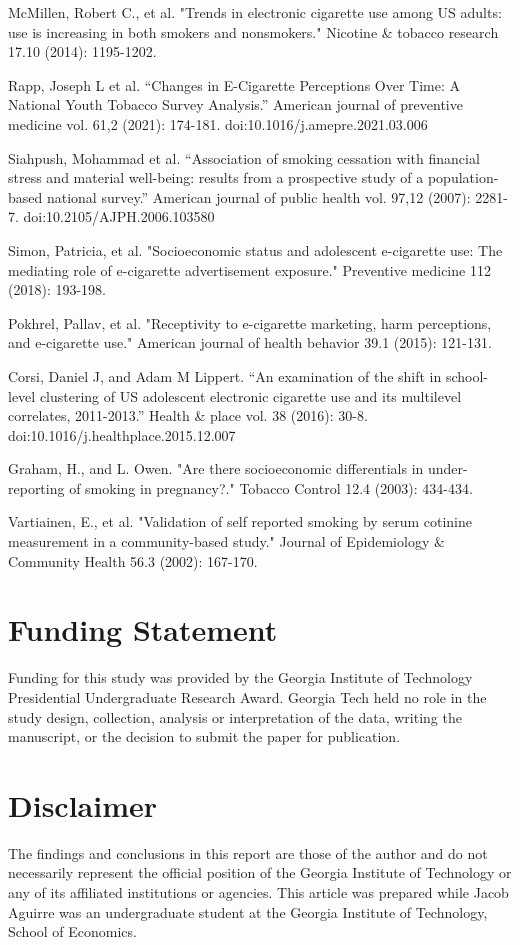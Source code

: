 \documentclass[12pt]{article}
\begin{document}
\begin{thebibliography}{}
McMillen, Robert C., et al. "Trends in electronic cigarette use among US adults: use is increasing in both smokers and nonsmokers." Nicotine \& tobacco research 17.10 (2014): 1195-1202.

Rapp, Joseph L et al. “Changes in E-Cigarette Perceptions Over Time: A National Youth Tobacco Survey Analysis.” American journal of preventive medicine vol. 61,2 (2021): 174-181. doi:10.1016/j.amepre.2021.03.006


Siahpush, Mohammad et al. “Association of smoking cessation with financial stress and material well-being: results from a prospective study of a population-based national survey.” American journal of public health vol. 97,12 (2007): 2281-7. doi:10.2105/AJPH.2006.103580


Simon, Patricia, et al. "Socioeconomic status and adolescent e-cigarette use: The mediating role of e-cigarette advertisement exposure." Preventive medicine 112 (2018): 193-198.

Pokhrel, Pallav, et al. "Receptivity to e-cigarette marketing, harm perceptions, and e-cigarette use." American journal of health behavior 39.1 (2015): 121-131.

Corsi, Daniel J, and Adam M Lippert. “An examination of the shift in school-level clustering of US adolescent electronic cigarette use and its multilevel correlates, 2011-2013.” Health \& place vol. 38 (2016): 30-8. doi:10.1016/j.healthplace.2015.12.007

Graham, H., and L. Owen. "Are there socioeconomic differentials in under-reporting of smoking in pregnancy?." Tobacco Control 12.4 (2003): 434-434.

Vartiainen, E., et al. "Validation of self reported smoking by serum cotinine measurement in a community-based study." Journal of Epidemiology \& Community Health 56.3 (2002): 167-170.

\end{thebibliography}


\section{Funding Statement}
Funding for this study was provided by the Georgia Institute of Technology Presidential Undergraduate Research Award. Georgia Tech held no role in the study design, collection, analysis or interpretation of the data, writing the manuscript, or the decision to submit the paper for publication.

\section{Disclaimer}
The findings and conclusions in this report are those of the author and do not necessarily represent the official position of the Georgia Institute of Technology or any of its affiliated institutions or agencies. This article was prepared while Jacob Aguirre was an undergraduate student at the Georgia Institute of Technology, School of Economics. 
\end{document}
